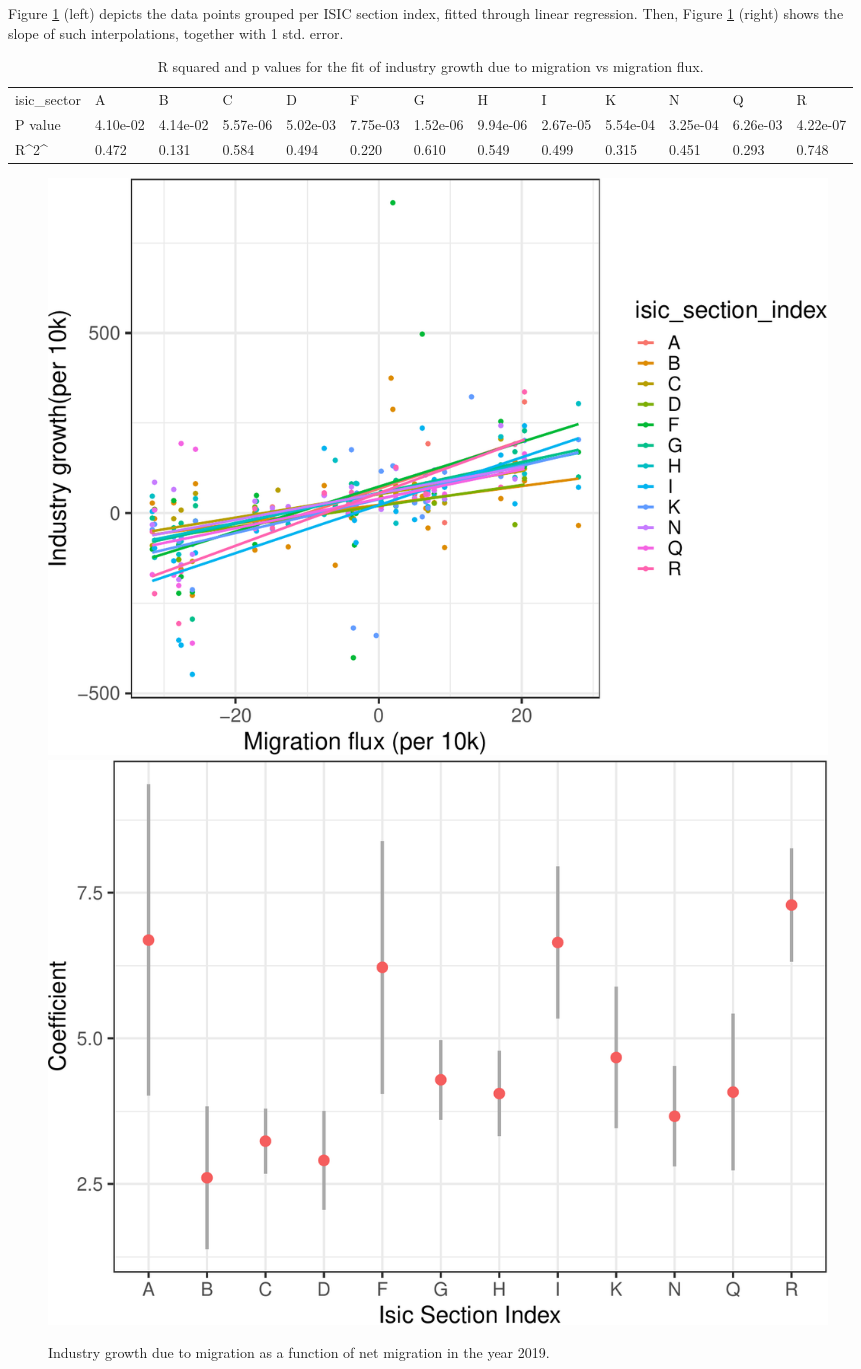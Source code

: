 \documentclass[
]{article}
\begin{document}
Figure \ref{fig:growthVSmigration2} (left) depicts the data points
grouped per ISIC section index, fitted through linear regression. Then,
Figure \ref{fig:growthVSmigration2} (right) shows the slope of such
interpolations, together with 1 std. error.

\begin{table}

\caption{\label{tab:growthVSmigration2}R squared and p values for the fit of industry growth due to migration vs migration flux.    \label{tab:industryGrowth}}
\centering
\begin{tabular}[t]{lllllllllllll}
\toprule
isic\_sector & A & B & C & D & F & G & H & I & K & N & Q & R\\
P value & 4.10e-02 & 4.14e-02 & 5.57e-06 & 5.02e-03 & 7.75e-03 & 1.52e-06 & 9.94e-06 & 2.67e-05 & 5.54e-04 & 3.25e-04 & 6.26e-03 & 4.22e-07\\
R\textasciicircum{}2\textasciicircum{} & 0.472 & 0.131 & 0.584 & 0.494 & 0.220 & 0.610 & 0.549 & 0.499 & 0.315 & 0.451 & 0.293 & 0.748\\
\bottomrule
\end{tabular}
\end{table}

\begin{figure}
\includegraphics[width=0.5\linewidth]{main_files/figure-latex/growthVSmigration2-1} \includegraphics[width=0.5\linewidth]{main_files/figure-latex/growthVSmigration2-2} \caption{Industry growth due to migration as a function of net migration in the year 2019. \label{fig:growthVSmigration2}}\label{fig:growthVSmigration2}
\end{figure}
\end{document}
